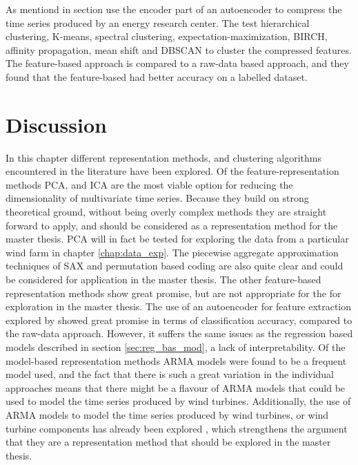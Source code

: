As mentiond in section \textcite{auto_encoder_many_tsc_algorithms} use the encoder part of an autoencoder to compress the time series produced by an energy research center. 
The test hierarchical clustering, K-means, spectral clustering, expectation-maximization, BIRCH, affinity propagation, mean shift and DBSCAN to cluster the compressed features. 
The feature-based approach is compared to a raw-data based approach, and they found that the feature-based had better accuracy on a labelled dataset.

\section{Discussion}
In this chapter different representation methods, and clustering algorithms encountered in the literature have been explored. 
Of the feature-representation methods PCA, and ICA are the most viable option for reducing the dimensionality of multivariate time series.
Because they build on strong theoretical ground, without being overly complex methods they are straight forward to apply, and should be considered as a representation method for the master thesis. 
PCA will in fact be tested for exploring the data from a particular wind farm in chapter \ref{chap:data_exp}.
The piecewise aggregate approximation techniques of SAX and permutation based coding are also quite clear and could be considered for application in the master thesis.
The other feature-based representation methods show great promise, but are not appropriate for the for exploration in the master thesis.
The use of an autoencoder for feature extraction explored by \textcite{auto_encoder_many_tsc_algorithms} showed great promise in terms of classification accuracy, compared to the raw-data approach.
However, it suffers the same issues as the regression based models described in section \ref{sec:reg_bas_mod}, a lack of interpretability. 
Of the model-based representation methods ARMA models were found to be a frequent model used, 
and the fact that there is such a great variation in the individual approaches means that there might be a flavour of ARMA models that could be used to model the time series produced by wind turbines.
Additionally, the use of ARMA models to model the time series produced by wind turbines, or wind turbine components has already been explored \cite{ml_cm_wt_blade_ARMA_2018, fault_detection_and_isolation_using_classifier_fusion, lin_and_non_lin_feat_for_ice_detection_on_blades, dirt_n_mud_detection_using_guided_waves, vibration_ARMA_decision_tree_cm_wt}, which strengthens the argument that they are a representation method that should be explored in the master thesis. %
